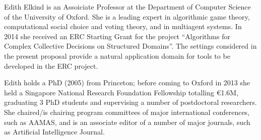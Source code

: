 \begin{participant}[type=PI,PM=2,salary=8000,gender=female]{Edith Elkind}
  is an Assoiciate Professor at the Department of Computer Science of the University of
  Oxford. She is a leading expert in algorithmic game theory, computational social choice
  and voting theory, and in multiagent systems. In 2014 she received an ERC Starting Grant
  for the project ``Algorithms for Complex Collective Decisions on Structured
  Domains''. The settings considered in the present proposal provide a natural application
  domain for tools to be developed in the ERC project.

  Edith holds a PhD (2005) from Princeton; before coming to Oxford in 2013 she held a
  Singapore National Research Foundation Fellowship totalling \euro 1.6M, graduating 3 PhD
  students and supervising a number of postdoctoral researchers. She chaired/is chairing
  program committees of major international conferences, such as AAMAS, and is an
  associate editor of a number of major journals, such as Artificial Intelligence Journal.
\end{participant}
